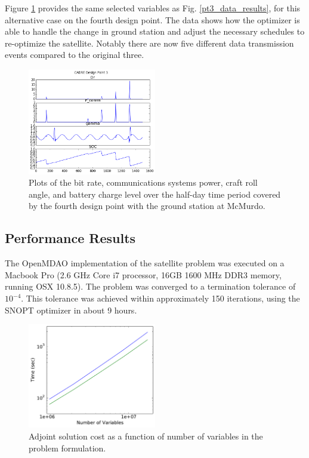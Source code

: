 \documentclass[]{aiaa-tc} %
\begin{document}
        Figure \ref{fig:pt3_results_mcmurdo} provides the same selected variables as Fig. \ref{pt3_data_results}, 
        for this alternative case on the fourth design point. The data shows how the optimizer is 
        able to handle the change in ground station and adjust the necessary schedules to re-optimize the 
        satellite. Notably there are now five different data transmission events compared to the original three. 


        \begin{figure}[!htbp]
            \centering
            \includegraphics[width=0.5\textwidth]{images/cadre_results_mcmurdo}
            \caption{Plots of the bit rate, communications systems power, craft roll angle,
        and battery charge level over the half-day time period covered by the fourth design point 
        with the ground station at McMurdo. }
            \label{fig:pt3_results_mcmurdo}
        \end{figure}


        \subsection{Performance Results}

            The OpenMDAO implementation of the satellite problem was executed on a
            Macbook Pro (2.6 GHz Core i7 processor, 16GB 1600 MHz DDR3 memory, running OSX 10.8.5). 
            The problem was converged to a termination tolerance of $10^{-4}$. This tolerance
            was achieved within approximately 150 iterations, using the SNOPT\cite{gill2005snopt}
            optimizer in about 9 hours. 

            \begin{figure}[!htbp]
                \centering
                \includegraphics[width=0.5\textwidth]{images/cadre_var_scaling}
                \caption{Adjoint solution cost as a function of number of variables in the problem formulation.}
                \label{fig:cadre-compute-cost}
            \end{figure}
\end{document}
